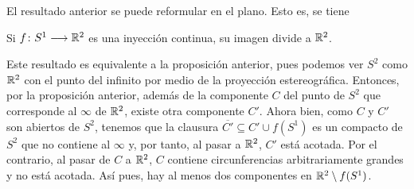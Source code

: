 \documentclass[GTS.tex]{subfiles}
\begin{document}
El resultado anterior se puede reformular en el plano. Esto es, se tiene

\begin{prop} 
Si $f\colon{S^1}\longrightarrow{\mathbb{R}^2}$ es una inyección continua, su imagen divide a $\mathbb{R}^2$.
\end{prop}

Este resultado es equivalente a la proposición anterior, pues podemos ver $S^2$ como $\mathbb{R}^2$ con el punto del infinito por medio de la proyección estereográfica. Entonces, por la proposición anterior, además de la componente $C$ del punto de $S^2$ que corresponde al $\infty$ de $\mathbb{R}^2$, existe otra componente $C'$. Ahora bien, como $C$ y $C'$ son abiertos de $S^2$, tenemos que la clausura $\overline{C'}\subseteq C'\cup f(S^1)$ es un compacto de $S^2$ que no contiene al $\infty$ y, por tanto, al pasar a $\mathbb{R}^2$, $C'$ está acotada. Por el contrario, al pasar de $C$ a $\mathbb{R}^2$, $C$ contiene circunferencias arbitrariamente grandes y no está acotada. Así pues, hay al menos dos componentes en $\mathbb{R}^2\setminus f(S^1)$.
\end{document}
